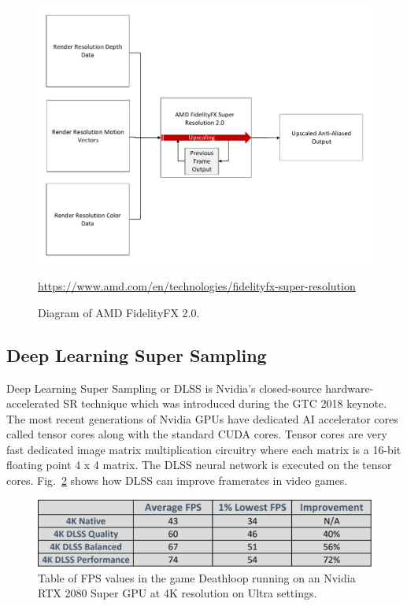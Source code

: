 \documentclass[10pt,oneside,english,a4paper]{article}
\begin{document}
\begin{figure}[htpb]
\centering
\includegraphics[scale=0.4]{diagramFSR.pdf}
\caption{Diagram of AMD FidelityFX 2.0.}
\url{https://www.amd.com/en/technologies/fidelityfx-super-resolution}
\label{f:fsr}
\end{figure}

\subsection{Deep Learning Super Sampling} \label{deep:dlss}

Deep Learning Super Sampling or DLSS is Nvidia’s closed-source hardware-accelerated SR technique which was introduced during the GTC 2018 keynote. The most recent generations of Nvidia GPUs have dedicated AI accelerator cores called tensor cores along with the standard CUDA cores. Tensor cores are very fast dedicated image matrix multiplication circuitry where each matrix is a 16-bit floating point 4 x 4 matrix. The DLSS neural network is executed on the tensor cores.\cite{oh2018nvidia} Fig.~\ref{f:fps} shows how DLSS can improve framerates in video games.

\begin{figure}[tbh]
\centering
\includegraphics[scale=0.4]{FPS.png}
\caption{Table of FPS values in the game Deathloop running on an Nvidia RTX 2080 Super GPU at 4K resolution on Ultra settings.}
\label{f:fps}
\end{figure}
\end{document}
